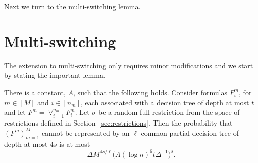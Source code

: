\documentclass{theoretics}
\begin{document}
Next we turn to the multi-switching lemma.

\section{Multi-switching} \label{sec:mswitch}

The extension to multi-switching only
requires minor modifications and we start by
stating the important lemma.

\begin{lemma}   \label{lemma:multiswitch}
  There is a constant, $A$, such that the
  following holds.
  Consider formulas $F_i^m$, for $m \in [M]$
  and $i \in [n_m]$, each associated with a decision tree of
  depth at most $t$ and let $F^m= \lor_{i=1}^{n_m} F_i^m$.
  Let $\sigma$ be a random full restriction from the 
  space of restrictions defined in Section~\ref{sec:restrictions}.
  Then the probability that $(F^m)_{m=1}^M$
  cannot be represented by an $\ell$ common partial
  decision tree of depth at most $4s$ is at most
  $$
  \Delta M^{4s/\ell} \big(A(\log n)^{6} t \Delta^{-1}\big)^{s}.$$
\end{lemma}
\end{document}
